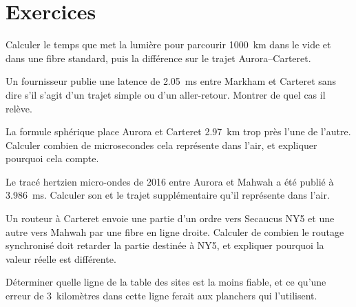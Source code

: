 \section{Exercices}

\begin{exercise}[$\star$]\label{exo:nw:the-north-american-map:1}
Calculer le temps que met la lumière pour parcourir \qty{1000}{\kilo\metre} dans le vide et dans une fibre standard, puis la différence sur le trajet Aurora--Carteret.
\end{exercise}

\begin{exercise}[$\star$]\label{exo:nw:the-north-american-map:2}
Un fournisseur publie une latence de \qty{2.05}{\milli\second} entre Markham et Carteret sans dire s'il s'agit d'un trajet simple ou d'un aller-retour. Montrer de quel cas il relève.
\end{exercise}

\begin{exercise}[$\star$]\label{exo:nw:the-north-american-map:3}
La formule sphérique place Aurora et Carteret \qty{2.97}{\kilo\metre} trop près l'une de l'autre. Calculer combien de microsecondes cela représente dans l'air, et expliquer pourquoi cela compte.
\end{exercise}

\begin{exercise}[$\star\star$]\label{exo:nw:the-north-american-map:4}
Le tracé hertzien micro-ondes de 2016 entre Aurora et Mahwah a été publié à \qty{3.986}{\milli\second}. Calculer son  et le trajet supplémentaire
qu'il représente dans l'air.
\end{exercise}

\begin{exercise}[$\star\star$]\label{exo:nw:the-north-american-map:5}
Un routeur à Carteret envoie une partie d'un ordre vers Secaucus NY5 et une autre vers Mahwah par une fibre en ligne droite. Calculer de combien le routage synchronisé
doit retarder la partie destinée à NY5, et expliquer pourquoi la valeur réelle est différente.
\end{exercise}

\begin{exercise}[$\star\star$]\label{exo:nw:the-north-american-map:6}
Déterminer quelle ligne de la table des sites est la moins fiable, et ce qu'une erreur de 3~kilomètres dans cette ligne ferait aux planchers qui l'utilisent.
\end{exercise}

